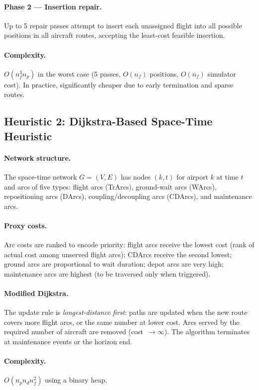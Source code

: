 \paragraph{Phase 2 — Insertion repair.}
Up to 5 repair passes attempt to insert each unassigned flight into all
possible positions in all aircraft routes, accepting the least-cost feasible
insertion.

\paragraph{Complexity.}
$O(n_f^3 n_p)$ in the worst case (5 passes, $O(n_f)$ positions, $O(n_f)$
simulator cost).  In practice, significantly cheaper due to early termination
and sparse routes.

\subsection{Heuristic 2: Dijkstra-Based Space-Time Heuristic}

\paragraph{Network structure.}
The space-time network $G = (V, E)$ has nodes $(k, t)$ for airport $k$ at
time $t$ and arcs of five types: flight arcs (TrArcs), ground-wait arcs
(WArcs), repositioning arcs (DArcs), coupling/decoupling arcs (CDArcs), and
maintenance arcs.

\paragraph{Proxy costs.}
Arc costs are ranked to encode priority: flight arcs receive the lowest cost
(rank of actual cost among unserved flight arcs); CDArcs receive the second
lowest; ground arcs are proportional to wait duration; depot arcs are very high;
maintenance arcs are highest (to be traversed only when triggered).

\paragraph{Modified Dijkstra.}
The update rule is \emph{longest-distance first}: paths are updated when the
new route covers more flight arcs, or the same number at lower cost.  Arcs
served by the required number of aircraft are removed (cost~$\to\infty$).
The algorithm terminates at maintenance events or the horizon end.

\paragraph{Complexity.}
$O(n_p n_d n_f^2)$ using a binary heap.

